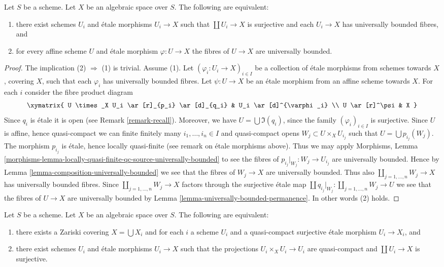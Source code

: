 \begin{lemma}
\label{lemma-U-universally-bounded}
Let $S$ be a scheme. Let $X$ be an algebraic space over $S$.
The following are equivalent:
\begin{enumerate}
\item there exist schemes $U_i$ and \'etale morphisms
$U_i \to X$ such that $\coprod U_i \to X$ is surjective and
each $U_i \to X$ has universally bounded fibres, and
\item for every affine scheme $U$ and \'etale morphism $\varphi : U \to X$
the fibres of $U \to X$ are universally bounded.
\end{enumerate}
\end{lemma}

\begin{proof}
The implication (2) $\Rightarrow$ (1) is trivial.
Assume (1). Let $(\varphi_i : U_i \to X)_{i \in I}$ be a collection of
\'etale morphisms from schemes towards $X$, covering $X$, such that
each $\varphi_i$ has universally bounded fibres.
Let $\psi : U \to X$ be an \'etale morphism from an affine scheme towards $X$.
For each $i$ consider the fibre product diagram
$$
\xymatrix{
U \times_X U_i \ar[r]_{p_i} \ar[d]_{q_i} & U_i \ar[d]^{\varphi_i} \\
U \ar[r]^\psi & X
}
$$
Since $q_i$ is \'etale it is open (see Remark \ref{remark-recall}).
Moreover, we have $U = \bigcup \Im(q_i)$, since the family
$(\varphi_i)_{i \in I}$ is surjective. Since $U$ is affine, hence quasi-compact
we can finite finitely many $i_1, \ldots, i_n \in I$ and quasi-compact
opens $W_j \subset U \times_X U_{i_j}$ such that
$U = \bigcup p_{i_j}(W_j)$.
The morphism $p_{i_j}$ is \'etale, hence locally quasi-finite
(see remark on \'etale morphisms above). Thus we may apply
Morphisms, Lemma
\ref{morphisms-lemma-locally-quasi-finite-qc-source-universally-bounded}
to see the fibres of $p_{i_j}|_{W_j} : W_j \to U_{i_j}$ are universally
bounded. Hence by
Lemma \ref{lemma-composition-universally-bounded}
we see that the fibres of $W_j \to X$ are universally bounded.
Thus also $\coprod_{j = 1, \ldots, n} W_j \to X$ has universally
bounded fibres. Since $\coprod_{j = 1, \ldots, n} W_j \to X$ factors
through the surjective \'etale map
$\coprod q_{i_j}|_{W_j} : \coprod_{j = 1, \ldots, n} W_j \to U$ we
see that the fibres of $U \to X$ are universally bounded by
Lemma \ref{lemma-universally-bounded-permanence}.
In other words (2) holds.
\end{proof}

\begin{lemma}
\label{lemma-characterize-very-reasonable}
Let $S$ be a scheme.
Let $X$ be an algebraic space over $S$.
The following are equivalent:
\begin{enumerate}
\item there exists a Zariski covering $X = \bigcup X_i$ and for
each $i$ a scheme $U_i$ and a quasi-compact surjective \'etale
morphism $U_i \to X_i$, and
\item there exist schemes $U_i$ and \'etale morphisms $U_i \to X$
such that the projections $U_i \times_X U_i \to U_i$ are quasi-compact
and $\coprod U_i \to X$ is surjective.
\end{enumerate}
\end{lemma}

